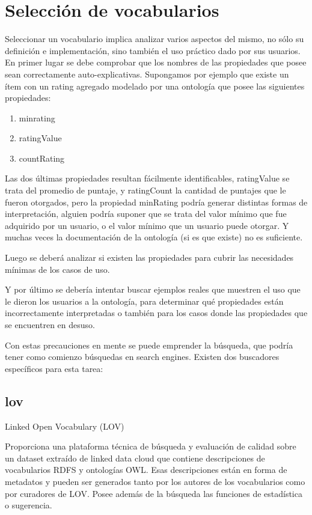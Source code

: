 \section{Selección de vocabularios}

Seleccionar un vocabulario implica analizar varios aspectos del mismo, no sólo su definición e implementación, sino también el uso práctico dado por sus usuarios. 
En primer lugar se debe comprobar que los nombres de las propiedades que posee sean correctamente auto-explicativas. Supongamos por ejemplo que existe un ítem con un rating agregado modelado por una ontología que posee las siguientes propiedades:

\begin{enumerate}
\item minrating
\item ratingValue
\item countRating
\end{enumerate}


Las dos últimas propiedades resultan fácilmente identificables, ratingValue se trata del promedio de puntaje, y ratingCount 
la cantidad de puntajes que le fueron otorgados, pero la propiedad minRating podría generar distintas formas de interpretación, 
alguien podría suponer que se trata del valor mínimo que fue adquirido por un usuario, o el valor mínimo que un usuario puede 
otorgar. Y muchas veces la documentación de la ontología (si es que existe) no es suficiente.

Luego se deberá analizar si existen las propiedades para cubrir las necesidades mínimas de los casos de uso.

Y por último se debería intentar buscar ejemplos reales que muestren el uso que le dieron los usuarios a la ontología, para 
determinar qué propiedades están incorrectamente interpretadas o también para los casos donde las propiedades que se encuentren 
en desuso.

Con estas precauciones en mente se puede emprender la búsqueda, que podría tener como comienzo búsquedas en  search engines. 
Existen dos buscadores específicos para esta tarea:

\subsection{lov}

Linked Open Vocabulary (LOV)

Proporciona una plataforma técnica de búsqueda y evaluación de calidad sobre un dataset extraído de linked data cloud que contiene descripciones de vocabularios RDFS 
y ontologías OWL. Esas descripciones están en forma de metadatos y pueden ser generados tanto por los autores de los vocabularios como por curadores de LOV.
Posee además de la búsqueda las funciones de estadística o sugerencia.

